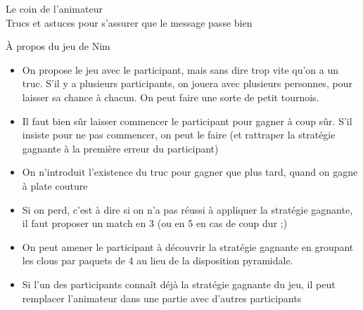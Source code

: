 \documentclass[final,hyperref={pdfpagelabels=false}]{beamer}
\renewcommand*{\large}{\fontsize{\resultlargeX}{\resultlargeY}\selectfont}
\begin{document}
\begin{frame}{Le coin de l'animateur\\[-5pt]
  {\large Trucs et astuces pour s'assurer que le message passe bien}}
\begin{block}{À propos du jeu de Nim}
\begin{itemize}
    \item On propose le jeu avec le participant, mais sans dire trop vite qu'on
      a un truc. S'il y a plusieurs participants, on jouera avec plusieurs
      personnes, pour laisser sa chance à chacun. On peut faire une sorte de
      petit tournois.
    \item Il faut bien sûr laisser commencer le participant pour gagner à coup
      sûr. S'il insiste pour ne pas commencer, on peut le faire (et rattraper
      la stratégie gagnante à la première erreur du participant)
    \item On n'introduit l'existence du truc pour gagner que plus tard, quand
      on gagne à plate couture
    \item Si on perd, c'est à dire si on n'a pas réussi à appliquer la
      stratégie gagnante, il faut proposer un match en 3 (ou en 5 en cas de
      coup dur ;)
    \item On peut amener le participant à découvrir la stratégie gagnante en
      groupant les clous par paquets de 4 au lieu de la disposition pyramidale.
    \item Si l'un des participants connaît déjà la stratégie gagnante du jeu,
      il peut remplacer l'animateur dans une partie avec d'autres participants
    \end{itemize}
  \end{block}
\end{frame}
\end{document}
